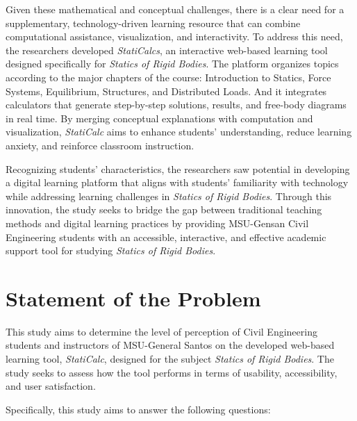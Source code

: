 Given these mathematical and conceptual challenges, there is a clear need for a supplementary, technology-driven learning resource that can combine computational assistance, visualization, and interactivity. To address this need, the researchers developed \textit{StatiCalcs}, an interactive web-based learning tool designed specifically for \textit{Statics of Rigid Bodies}. The platform organizes topics according to the major chapters of the course: Introduction to Statics, Force Systems, Equilibrium, Structures, and Distributed Loads. And it integrates calculators that generate step-by-step solutions, results, and free-body diagrams in real time. By merging conceptual explanations with computation and visualization, \textit{StatiCalc} aims to enhance students’ understanding, reduce learning anxiety, and reinforce classroom instruction.

Recognizing students' characteristics, the researchers saw potential in developing a digital learning platform that aligns with students’ familiarity with technology while addressing learning challenges in \textit{Statics of Rigid Bodies}. Through this innovation, the study seeks to bridge the gap between traditional teaching methods and digital learning practices by providing MSU-Gensan Civil Engineering students with an accessible, interactive, and effective academic support tool for studying \textit{Statics of Rigid Bodies}.

\section{Statement of the Problem}\label{sec:1-sop}

This study aims to determine the level of perception of Civil Engineering students and instructors of MSU-General Santos on the developed web-based learning tool, \textit{StatiCalc}, designed for the subject \textit{Statics of Rigid Bodies}. The study seeks to assess how the tool performs in terms of usability, accessibility, and user satisfaction.

Specifically, this study aims to answer the following questions:


